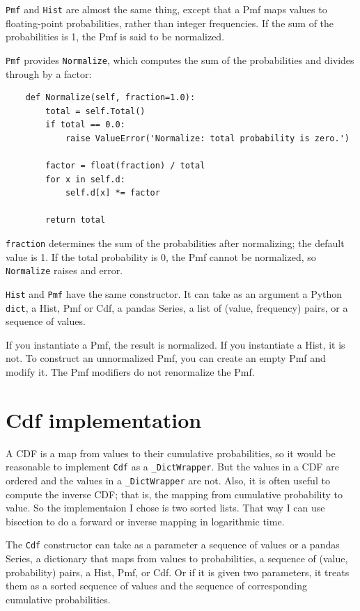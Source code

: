 \documentclass[12pt]{book}
\begin{document}
{\tt Pmf} and {\tt Hist} are almost the same thing, except that a Pmf
maps values to floating-point probabilities, rather than integer
frequencies.  If the sum of the probabilities is 1, the Pmf is said to
be normalized.

{\tt Pmf} provides {\tt Normalize}, which computes the sum of the
probabilities and divides through by a factor:

\begin{verbatim}
    def Normalize(self, fraction=1.0):
        total = self.Total()
        if total == 0.0:
            raise ValueError('Normalize: total probability is zero.')

        factor = float(fraction) / total
        for x in self.d:
            self.d[x] *= factor

        return total
\end{verbatim}

{\tt fraction} determines the sum of the probabilities after normalizing;
the default value is 1.
If the total probability is 0, the Pmf cannot be normalized, so
{\tt Normalize} raises and error.

{\tt Hist} and {\tt Pmf} have the same constructor.  It can take
as an argument a Python {\tt dict}, a Hist, Pmf or Cdf, a pandas
Series, a list of (value, frequency) pairs, or a sequence of values.

If you instantiate a Pmf, the result is normalized.  If you
instantiate a Hist, it is not.  To construct an unnormalized Pmf,
you can create an empty Pmf and modify it.  The Pmf modifiers do
not renormalize the Pmf.


\section{Cdf implementation}

A CDF is a map from values to their cumulative probabilities, so
it would be reasonable to implement {\tt Cdf} as a \verb"_DictWrapper".
But the values in a CDF are ordered and the values in a \verb"_DictWrapper"
are not.  Also, it is often useful to compute the inverse CDF; that
is, the mapping from cumulative probability to value.  So the
implementaion I chose is two sorted lists.  That way I can use
bisection to do a forward or inverse mapping in logarithmic time.

The {\tt Cdf} constructor can take as a parameter a sequence of values
or a pandas Series, a dictionary that maps from values to
probabilities, a sequence of (value, probability) pairs, a Hist, Pmf,
or Cdf.  Or if it is given two parameters, it treats them as a sorted
sequence of values and the sequence of corresponding cumulative
probabilities.
\end{document}
